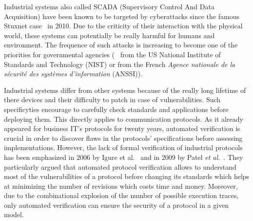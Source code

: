 Industrial systems also called SCADA (Supervisory Control And Data
Acquisition) have been known to be targeted by cyberattacks since the
famous Stuxnet case~\cite{Lan11} in 2010.  Due to the criticity of
their interaction with the physical world, these systems can
potentially be really harmful for humans and environment.  The
frequence of such attacks is increasing to become one of the priorities for
governmental agencies (\eg~\cite{SFS11} from the US National Institute of
Standards and Technology (NIST) or
\cite{ANSSI12_guide_securite_industrielle_en} from the French {\em Agence
nationale de la sécurité des systèmes d'information} (ANSSI)).


Industrial systems differ from other systems because of
the really long lifetime of there devices and their difficulty to
patch in case of vulnerabilities.
Such specificyties encourage to carefully check
standards and applications before deploying them.
This directly applies to communication protocols.
As it already appeared for business IT's protocols for twenty years, automated
verification is crucial in order to discover flaws in the protocols'
specifications before assessing implementations. However, the lack of formal
verification of industrial protocols has been emphasized
in 2006 by Igure et al.~\cite{ILW06} and in 2009 by Patel \emph{et
al.}~\cite{PBG09}.
They particularly argued that automated protocol verification allows
to understand most of the vulnerabilities of a protocol before
changing its standards which helps at minimizing the number of
revisions which costs time and money.  Moreover, due to the
combinational explosion of the number of possible execution traces,
only automated verification can ensure the security of a protocol in a
given model.

